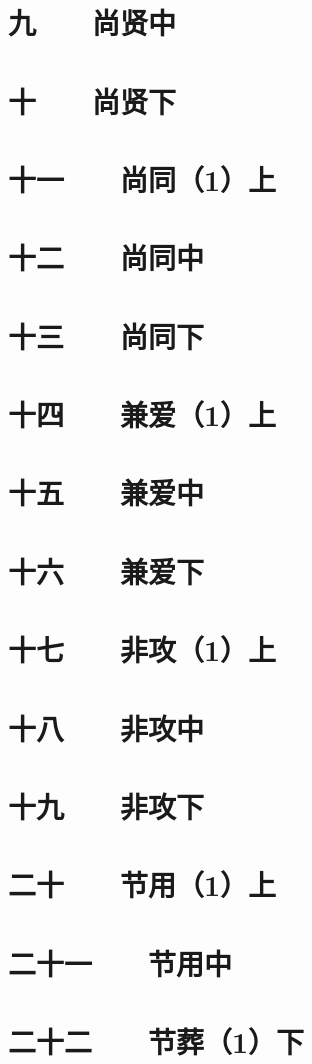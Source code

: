 \documentclass[12pt,UTF8]{ctexbook}
\begin{document}
\chapter{九　　尚贤中  }             
\chapter{十　　尚贤下}
\chapter{十一　　尚同（1）上}
\chapter{十二　　尚同中}
\chapter{十三　　尚同下}
\chapter{十四　　兼爱（1）上}
\chapter{十五　　兼爱中}
\chapter{十六　　兼爱下}
\chapter{十七　　非攻（1）上}
\chapter{十八　　非攻中}
\chapter{十九　　非攻下}
\chapter{二十　　节用（1）上}
\chapter{二十一　　节用中}
\chapter{二十二　　节葬（1）下}
\end{document}
